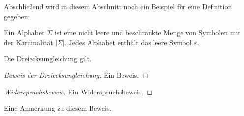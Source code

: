 Abschließend wird in diesem Abschnitt noch ein Beispiel für eine Definition
gegeben:
\begin{definition}[Alphabet]\label{def:Alphabet}
Ein Alphabet $\Sigma $ ist eine nicht leere und beschränkte Menge von Symbolen
mit der Kardinalität $|\Sigma|$. Jedes Alphabet enthält das leere Symbol
$\varepsilon$.
\end{definition}
\begin{satz}
Die Dreiecksungleichung gilt.
\end{satz}
\begin{proof}[Beweis der Dreiecksungleichung]
Ein Beweis.
\end{proof}
\begin{proof}[Widerspruchsbeweis]
\renewcommand{\qedsymbol}{\lightning}
Ein Widerspruchsbeweis.
\end{proof}
\begin{bem}
Eine Anmerkung zu diesem Beweis.
\end{bem}


